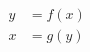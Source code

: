 \documentclass[preview,varwidth ,multi]{standalone}
\begin{document}
\preview
$\begin{aligned}
y &= f(x) \\
x &= g(y)
\end{aligned}$
\endpreview
\end{document}
